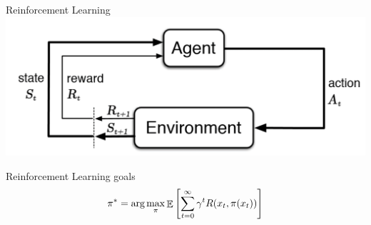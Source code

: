 \documentclass{beamer}
\begin{document}
\begin{frame}{Reinforcement Learning}
\includegraphics[width=\linewidth]{gfx/rl_cycle.pdf}

\begin{block}{Reinforcement Learning goals}
$$\pi^* = \text{arg}\max_\pi \mathop{\mathbb{E}} \left[ \sum_{t=0}^\infty \gamma^tR(x_t,\pi(x_t))\right]$$
\end{block}
\end{frame}


%


%
\end{document}
